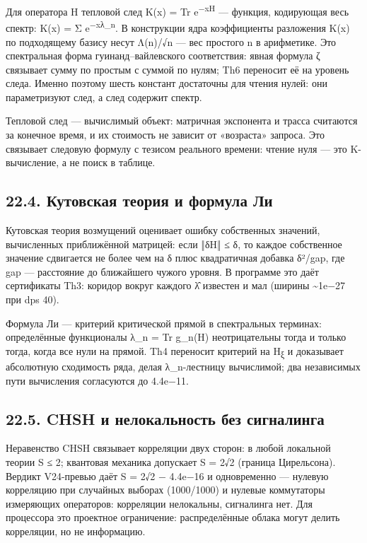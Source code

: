 \documentclass[11pt,a4paper]{article}
\begin{document}
Для оператора H тепловой след K(x) = Tr e\textsuperscript{−xH} — функция, кодирующая весь спектр: K(x) = Σ e\textsuperscript{−xλ\_n}. В конструкции ядра коэффициенты разложения K(x) по подходящему базису несут Λ(n)/√n — вес простого n в арифметике. Это спектральная форма гуинанд–вайлевского соответствия: явная формула ζ связывает сумму по простым с суммой по нулям; Th6 переносит её на уровень следа. Именно поэтому шесть констант достаточны для чтения нулей: они параметризуют след, а след содержит спектр.

Тепловой след — вычислимый объект: матричная экспонента и трасса считаются за конечное время, и их стоимость не зависит от «возраста» запроса. Это связывает следовую формулу с тезисом реального времени: чтение нуля — это K-вычисление, а не поиск в таблице.

\subsection{22.4. Кутовская теория и формула Ли}

Кутовская теория возмущений оценивает ошибку собственных значений, вычисленных приближённой матрицей: если ‖δH‖ ≤ δ, то каждое собственное значение сдвигается не более чем на δ плюс квадратичная добавка δ²/gap, где gap — расстояние до ближайшего чужого уровня. В программе это даёт сертификаты Th3: коридор вокруг каждого λ̂ известен и мал (ширины \textasciitilde{}1e−27 при dps 40).

Формула Ли — критерий критической прямой в спектральных терминах: определённые функционалы λ\_n = Tr g\_n(H) неотрицательны тогда и только тогда, когда все нули на прямой. Th4 переносит критерий на H\textsubscript{ξ} и доказывает абсолютную сходимость ряда, делая λ\_n-лестницу вычислимой; два независимых пути вычисления согласуются до 4.4e−11.

\subsection{22.5. CHSH и нелокальность без сигналинга}

Неравенство CHSH связывает корреляции двух сторон: в любой локальной теории S ≤ 2; квантовая механика допускает S = 2√2 (граница Цирельсона). Вердикт V24-превью даёт S = 2√2 − 4.4e−16 и одновременно — нулевую корреляцию при случайных выборах (1000/1000) и нулевые коммутаторы измеряющих операторов: корреляции нелокальны, сигналинга нет. Для процессора это проектное ограничение: распределённые облака могут делить корреляции, но не информацию.
\end{document}
